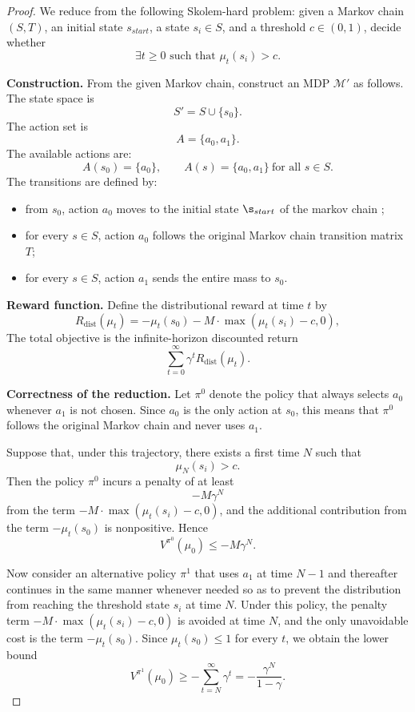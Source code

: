 \documentclass{article}
\begin{document}
\begin{proof}
We reduce from the following Skolem-hard problem: given a Markov chain $(S,T)$, an initial state $s_{start}$, a state $s_i \in S$, and a threshold $c \in (0,1)$, decide whether
\[
\exists t \ge 0 \text{ such that } \mu_t(s_i) > c.
\]

\medskip
\noindent
\textbf{Construction.}
From the given Markov chain, construct an MDP $\mathcal{M}'$ as follows.
The state space is
\[
S' = S \cup \{s_0\}.
\]
The action set is
\[
A = \{a_0,a_1\}.
\]
The available actions are:
\[
A(s_0)=\{a_0\}, \qquad A(s)=\{a_0,a_1\}\ \text{for all } s\in S.
\]
The transitions are defined by:
\begin{itemize}
    \item from $s_0$, action $a_0$ moves to the initial state $\s_{start}$ of the markov chain ;
    \item for every $s\in S$, action $a_0$ follows the original Markov chain transition matrix $T$;
    \item for every $s\in S$, action $a_1$ sends the entire mass to $s_0$.
\end{itemize}

\medskip
\noindent
\textbf{Reward function.}
Define the distributional reward at time $t$ by
\[
R_{\mathrm{dist}}(\mu_t)
=
-\mu_t(s_0)
-
M\cdot \max(\mu_t(s_i)-c,0),
\]
The total objective is the infinite-horizon discounted return
\[
\sum_{t=0}^{\infty}\gamma^t R_{\mathrm{dist}}(\mu_t).
\]

\medskip
\noindent
\textbf{Correctness of the reduction.}
Let $\pi^0$ denote the policy that always selects $a_0$ whenever $a_1$ is not chosen. Since $a_0$ is the only action at $s_0$, this means that $\pi^0$ follows the original Markov chain and never uses $a_1$.

Suppose that, under this trajectory, there exists a first time $N$ such that
\[
\mu_N(s_i)>c.
\]
Then the policy $\pi^0$ incurs a penalty of at least
\[
-M\gamma^N
\]
from the term $-M\cdot \max(\mu_t(s_i)-c,0)$, and the additional contribution from the term
$-\mu_t(s_0)$ is nonpositive. Hence
\[
V^{\pi^0}(\mu_0)\le -M\gamma^N.
\]

Now consider an alternative policy $\pi^1$ that uses $a_1$ at time $N-1$ and thereafter continues in the same manner whenever needed so as to prevent the distribution from reaching the threshold state $s_i$ at time $N$.
Under this policy, the penalty term $-M\cdot \max(\mu_t(s_i)-c,0)$ is avoided at time $N$, and the only unavoidable cost is the term $-\mu_t(s_0)$.
Since $\mu_t(s_0)\le 1$ for every $t$, we obtain the lower bound
\[
V^{\pi^1}(\mu_0)
\ge
-\sum_{t=N}^{\infty}\gamma^t
=
-\frac{\gamma^{N}}{1-\gamma}.
\]


\end{proof}
\end{document}
